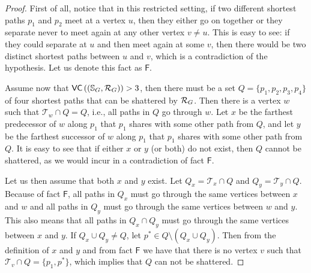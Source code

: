\begin{proof}
  First of all, notice that in this restricted setting, if two different
  shortest paths $p_1$ and $p_2$ meet at a vertex $u$, then they either go on
  together or %
  they separate never to meet again at any other
  vertex $v\neq u$. This is easy to see: if they could separate at $u$ and then
  meet again at some $v$, then there would be two distinct shortest paths
  between $u$ and $v$, which is a contradiction of the hypothesis. Let us denote
  this fact as $\mathsf{F}$.

  Assume now that $\mathsf{VC}\left((\mathbb{S}_G,\mathcal{R}_G)\right)>3$, then there must be a set
  $Q=\{p_1,p_2,p_3,p_4\}$ of four shortest paths that can be shattered by
  $\mathcal{R}_G$. Then there is a vertex $w$ such that $\mathcal{T}_w\cap Q=Q$, i.e.,
  all paths in $Q$ go through $w$. Let $x$ be the farthest predecessor of $w$
  along $p_1$ that $p_1$ shares with some other path from $Q$, and let $y$ be
  the farthest successor of $w$ along $p_1$ that $p_1$ shares with some other
  path from $Q$. It is easy to see that if either $x$ or $y$ (or both) do not
  exist, then $Q$ cannot be shattered, as we would incur in a contradiction of
  fact $\mathsf{F}$. 
  
  Let us then assume that both $x$ and $y$ exist.
  Let $Q_x=\mathcal{T}_x\cap Q$ and $Q_y=\mathcal{T}_y\cap Q$.
  Because of fact $\mathsf{F}$, all paths in $Q_x$ must go through the same vertices
  between $x$ and $w$ and all paths in $Q_y$ must go through the same vertices
  between $w$ and $y$. This also means that all paths in $Q_x\cap Q_y$ must go
  through the same vertices between $x$ and $y$. If $Q_x\cup Q_y\neq Q$, let
  $p^*\in Q\setminus(Q_x\cup Q_y)$. Then from the definition of $x$ and $y$ and
  from fact $\mathsf{F}$ we have that there is no vertex $v$ such that
  $\mathcal{T}_v\cap Q=\{p_1,p^*\}$, which implies that $Q$ can not be
  shattered. 
  

\end{proof}
